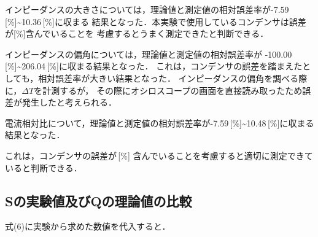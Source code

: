 インピーダンスの大きさについては，理論値と測定値の相対誤差率が-7.59\,[\%]\sim10.36\,[\%]に収まる
結果となった．本実験で使用しているコンデンサは誤差が[\%]含んでいることを
考慮するとうまく測定できたと判断できる．

インピーダンスの偏角については，理論値と測定値の相対誤差率が
-100.00\,[\%]\sim206.04\,[\%]に収まる結果となった．
これは，コンデンサの誤差を踏まえたとしても，相対誤差率が大きい結果となった．
インピーダンスの偏角を調べる際に，$\Delta T$を計測するが，
その際にオシロスコープの画面を直接読み取ったため誤差が発生したと考えられる．

電流相対比について，理論値と測定値の相対誤差率が-7.59\,[\%]\sim10.48\,[\%]に収まる結果となった．

これは，コンデンサの誤差が\,[\%]
含んでいることを考慮すると適切に測定できていると判断できる．

\subsection{Sの実験値及びQの理論値の比較}
式(6)に実験から求めた数値を代入すると．